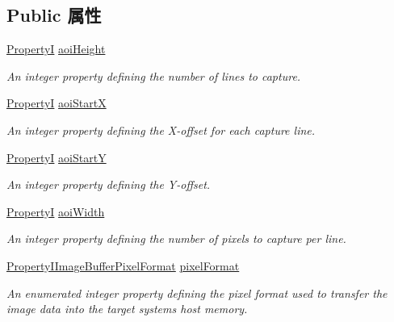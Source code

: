 \subsection*{Public 属性}
\begin{DoxyCompactItemize}
\item 
\hypertarget{classmv_i_m_p_a_c_t_1_1acquire_1_1_camera_settings_base_a0058890a1b217348bc9d74276d136cd0}{\hyperlink{group___common_interface_ga12d5e434238ca242a1ba4c6c3ea45780}{Property\+I} \hyperlink{classmv_i_m_p_a_c_t_1_1acquire_1_1_camera_settings_base_a0058890a1b217348bc9d74276d136cd0}{aoi\+Height}}\label{classmv_i_m_p_a_c_t_1_1acquire_1_1_camera_settings_base_a0058890a1b217348bc9d74276d136cd0}

\begin{DoxyCompactList}\small\item\em An integer property defining the number of lines to capture. \end{DoxyCompactList}\item 
\hyperlink{group___common_interface_ga12d5e434238ca242a1ba4c6c3ea45780}{Property\+I} \hyperlink{classmv_i_m_p_a_c_t_1_1acquire_1_1_camera_settings_base_adbfbd65eb718a5a57084b7fc8f594ace}{aoi\+Start\+X}
\begin{DoxyCompactList}\small\item\em An integer property defining the X-\/offset for each capture line. \end{DoxyCompactList}\item 
\hyperlink{group___common_interface_ga12d5e434238ca242a1ba4c6c3ea45780}{Property\+I} \hyperlink{classmv_i_m_p_a_c_t_1_1acquire_1_1_camera_settings_base_a848ee514681ffe6bf617cf6de0bf5a48}{aoi\+Start\+Y}
\begin{DoxyCompactList}\small\item\em An integer property defining the Y-\/offset. \end{DoxyCompactList}\item 
\hypertarget{classmv_i_m_p_a_c_t_1_1acquire_1_1_camera_settings_base_ac1d058292017a9d17046e5ab3ba38933}{\hyperlink{group___common_interface_ga12d5e434238ca242a1ba4c6c3ea45780}{Property\+I} \hyperlink{classmv_i_m_p_a_c_t_1_1acquire_1_1_camera_settings_base_ac1d058292017a9d17046e5ab3ba38933}{aoi\+Width}}\label{classmv_i_m_p_a_c_t_1_1acquire_1_1_camera_settings_base_ac1d058292017a9d17046e5ab3ba38933}

\begin{DoxyCompactList}\small\item\em An integer property defining the number of pixels to capture per line. \end{DoxyCompactList}\item 
\hyperlink{group___common_interface_ga4f53082cdae4edfc1f87e928a0ab4184}{Property\+I\+Image\+Buffer\+Pixel\+Format} \hyperlink{classmv_i_m_p_a_c_t_1_1acquire_1_1_camera_settings_base_af295aa670e45c6cbdb6e5d8517922371}{pixel\+Format}
\begin{DoxyCompactList}\small\item\em An enumerated integer property defining the pixel format used to transfer the image data into the target systems host memory. \end{DoxyCompactList}\end{DoxyCompactItemize}
